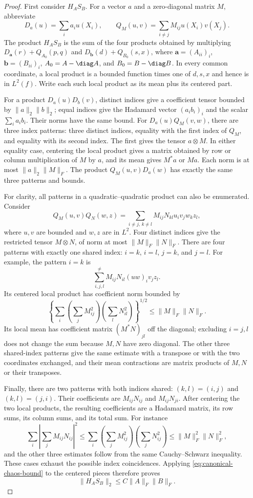 \begin{proof}
First consider $H_AS_B$.  For a vector $a$ and a zero-diagonal
matrix $M$, abbreviate
\[
 D_a(u)=\sum_i a_i u(X_i),\qquad
 Q_M(u,v)=\sum_{i\ne j}M_{ij}u(X_i)v(X_j).
\]
The product $H_AS_B$ is the sum of the four products obtained by
multiplying $D_{\mathbf a}(r)+Q_{A_0}(p,q)$
and $D_{\mathbf b}(d)+Q_{B_0}(s,x)$, where
$\mathbf a=(A_{ii})_i$, $\mathbf b=(B_{ii})_i$,
$A_0=A-\diag A$, and
$B_0=B-\diag B$.
In every common coordinate, a local product is a bounded function
times one of $d,s,x$ and hence is in $L^2(f)$.  Write each such
local product as its mean plus its centered part.

For a product $D_a(u)D_b(v)$, distinct indices give a coefficient
tensor bounded by $\|a\|_2\|b\|_2$; equal indices give the
Hadamard vector $(a_ib_i)_i$ and the scalar $\sum_i a_ib_i$.
Their norms have the same bound.  For $D_a(u)Q_M(v,w)$, there
are three index patterns: three distinct indices, equality with
the first index of $Q_M$, and equality with its second index.
The first gives the tensor $a\otimes M$.  In either equality
case, centering the local product gives a matrix obtained by
row or column multiplication of $M$ by $a$, and its mean gives
$M^*a$ or $Ma$.  Each norm is at most
$\|a\|_2\|M\|_F$.  The product $Q_M(u,v)D_a(w)$ has exactly
the same three patterns and bounds.

For clarity, all patterns in a quadratic--quadratic product can
also be enumerated.  Consider
\[
 Q_M(u,v)Q_N(w,z)
 =\sum_{i\ne j,\,k\ne l}M_{ij}N_{kl}
                         u_i v_j w_k z_l,
\]
where $u,v$ are bounded and $w,z$ are in $L^2$.  Four distinct
indices give the restricted tensor $M\otimes N$, of norm at
most $\|M\|_F\|N\|_F$.  There are four patterns with exactly
one shared index: $i=k$, $i=l$, $j=k$, and $j=l$.
For example, the pattern $i=k$ is
\[
 \sum_{i,j,l}^{\ne}M_{ij}N_{il}(uw)_i v_jz_l.
\]
Its centered local product has coefficient norm bounded by
\[
 \left\{\sum_i\left(\sum_j M_{ij}^2\right)
                    \left(\sum_l N_{il}^2\right)\right\}^{1/2}
 \le\|M\|_F\|N\|_F.
\]
Its local mean has coefficient matrix
$(M^*N)_{jl}$ off the diagonal; excluding $i=j,l$
does not change the sum because $M,N$ have zero diagonal.
The other three shared-index patterns give the same estimate
with a transpose or with the two coordinates exchanged, and
their mean contractions are matrix products of $M,N$ or their
transposes.

Finally, there are two patterns with both indices shared:
$(k,l)=(i,j)$ and $(k,l)=(j,i)$.  Their coefficients are
$M_{ij}N_{ij}$ and $M_{ij}N_{ji}$.  After centering the two
local products, the resulting coefficients are a Hadamard
matrix, its row sums, its column sums, and its total sum.
For instance
\[
 \sum_i\left|\sum_j M_{ij}N_{ij}\right|^2
 \le\sum_i\left(\sum_j M_{ij}^2\right)
            \left(\sum_j N_{ij}^2\right)
 \le\|M\|_F^2\|N\|_F^2,
\]
and the other three estimates follow from the same
Cauchy--Schwarz inequality.  These cases exhaust the possible
index coincidences.  Applying
\eqref{eq:canonical-chaos-bound} to the centered pieces
therefore proves
\begin{equation}
 \|H_AS_B\|_2\le C\|A\|_F\|B\|_F.
 \label{eq:coordinate-function-score-bound}
\end{equation}


\end{proof}
